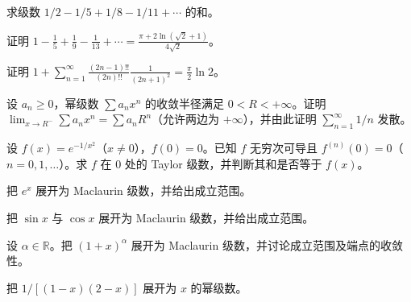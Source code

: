 \newpage
\noindent\begin{minipage}{\textwidth}
求级数 $1/2-1/5+1/8-1/11+\cdots$ 的和。
\end{minipage}\par\vfill
\noindent\begin{minipage}{\textwidth}
证明 $\displaystyle1-\frac15+\frac19-\frac1{13}+\cdots=\frac{\pi+2\ln(\sqrt2+1)}{4\sqrt2}$。
\end{minipage}\par\vfill
\noindent\begin{minipage}{\textwidth}
证明 $\displaystyle1+\sum_{n=1}^{\infty}\frac{(2n-1)!!}{(2n)!!}\frac1{(2n+1)^2}=\frac\pi2\ln2$。
\end{minipage}\par\vfill
\newpage
\noindent\begin{minipage}{\textwidth}
设 $a_n\ge0$，幂级数 $\sum a_nx^n$ 的收敛半径满足 $0<R<+\infty$。证明 $\lim_{x\to R^-}\sum a_nx^n=\sum a_nR^n$（允许两边为 $+\infty$），并由此证明 $\sum_{n=1}^{\infty}1/n$ 发散。
\end{minipage}\par\vfill
\noindent\begin{minipage}{\textwidth}
设 $f(x)=e^{-1/x^2}$（$x\ne0$），$f(0)=0$。已知 $f$ 无穷次可导且 $f^{(n)}(0)=0$（$n=0,1,\ldots$）。求 $f$ 在 $0$ 处的 Taylor 级数，并判断其和是否等于 $f(x)$。
\end{minipage}\par\vfill
\noindent\begin{minipage}{\textwidth}
把 $e^x$ 展开为 Maclaurin 级数，并给出成立范围。
\end{minipage}\par\vfill
\newpage
\noindent\begin{minipage}{\textwidth}
把 $\sin x$ 与 $\cos x$ 展开为 Maclaurin 级数，并给出成立范围。
\end{minipage}\par\vfill
\noindent\begin{minipage}{\textwidth}
设 $\alpha\in\mathbb R$。把 $(1+x)^\alpha$ 展开为 Maclaurin 级数，并讨论成立范围及端点的收敛性。
\end{minipage}\par\vfill
\noindent\begin{minipage}{\textwidth}
把 $1/[(1-x)(2-x)]$ 展开为 $x$ 的幂级数。
\end{minipage}\par\vfill
